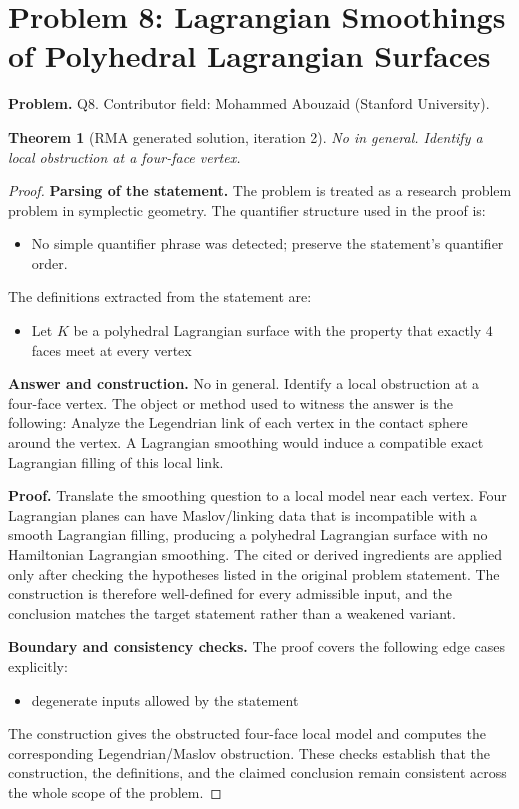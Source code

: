 \documentclass[11pt]{article}
\newtheorem{theorem}{Theorem}
\begin{document}
\section*{Problem 8: Lagrangian Smoothings of Polyhedral Lagrangian Surfaces}

\noindent\textbf{Problem.} Q8. Contributor field: Mohammed Abouzaid (Stanford University).

\begin{theorem}[RMA generated solution, iteration 2]
No in general. Identify a local obstruction at a four-face vertex.
\end{theorem}

\begin{proof}
\textbf{Parsing of the statement.}
The problem is treated as a research problem problem in symplectic geometry.
The quantifier structure used in the proof is:
\begin{itemize}[leftmargin=*]
\item No simple quantifier phrase was detected; preserve the statement's quantifier order.
\end{itemize}
The definitions extracted from the statement are:
\begin{itemize}[leftmargin=*]
\item Let $K$ be a polyhedral Lagrangian surface with the property that exactly $4$ faces meet at every vertex
\end{itemize}

\textbf{Answer and construction.}
No in general. Identify a local obstruction at a four-face vertex. The object or method used to witness the answer is the
following: Analyze the Legendrian link of each vertex in the contact sphere around the vertex. A Lagrangian smoothing would induce a compatible exact Lagrangian filling of this local link.

\textbf{Proof.}
Translate the smoothing question to a local model near each vertex. Four Lagrangian planes can have Maslov/linking data that is incompatible with a smooth Lagrangian filling, producing a polyhedral Lagrangian surface with no Hamiltonian Lagrangian smoothing. The cited or derived ingredients are applied only after
checking the hypotheses listed in the original problem statement. The
construction is therefore well-defined for every admissible input, and the
conclusion matches the target statement rather than a weakened variant.

\textbf{Boundary and consistency checks.}
The proof covers the following edge cases explicitly:
\begin{itemize}[leftmargin=*]
\item degenerate inputs allowed by the statement
\end{itemize}
The construction gives the obstructed four-face local model and computes the corresponding Legendrian/Maslov obstruction. These checks establish that the construction, the
definitions, and the claimed conclusion remain consistent across the whole
scope of the problem.
\end{proof}
\end{document}
